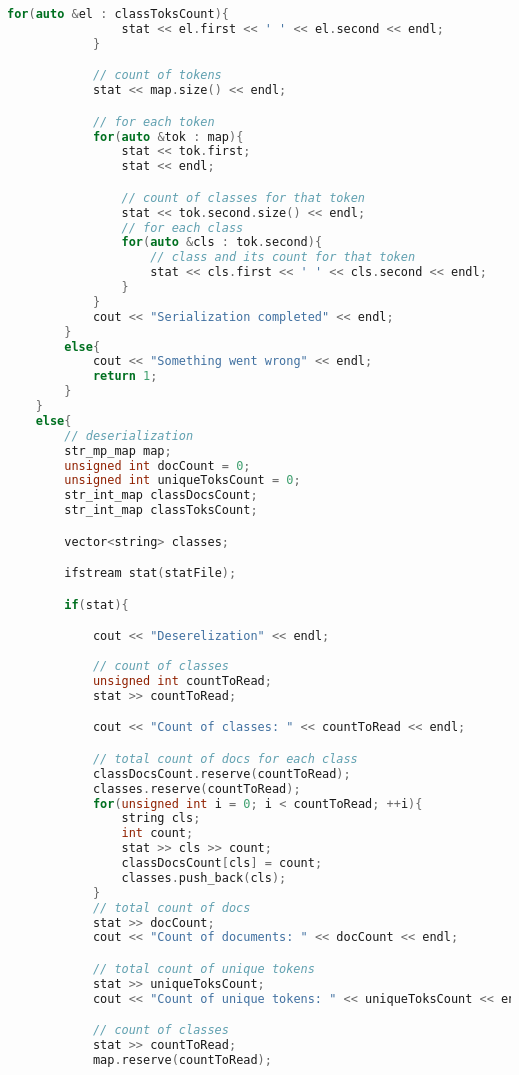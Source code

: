 \documentclass[12pt,a4paper]{scrartcl}
\begin{document}
\begin{lstlisting}[language=C++, basicstyle=\scriptsize]
            for(auto &el : classToksCount){
                stat << el.first << ' ' << el.second << endl;
            }

            // count of tokens
            stat << map.size() << endl;

            // for each token
            for(auto &tok : map){
                stat << tok.first;
                stat << endl;

                // count of classes for that token
                stat << tok.second.size() << endl;
                // for each class 
                for(auto &cls : tok.second){
                    // class and its count for that token
                    stat << cls.first << ' ' << cls.second << endl;
                }
            }
            cout << "Serialization completed" << endl;
        }
        else{
            cout << "Something went wrong" << endl;
            return 1;
        }
    }
    else{
        // deserialization
        str_mp_map map;
        unsigned int docCount = 0;
        unsigned int uniqueToksCount = 0;
        str_int_map classDocsCount;
        str_int_map classToksCount;

        vector<string> classes;

        ifstream stat(statFile);

        if(stat){

            cout << "Deserelization" << endl;
            
            // count of classes
            unsigned int countToRead;
            stat >> countToRead;

            cout << "Count of classes: " << countToRead << endl;

            // total count of docs for each class
            classDocsCount.reserve(countToRead);
            classes.reserve(countToRead);
            for(unsigned int i = 0; i < countToRead; ++i){
                string cls;
                int count;
                stat >> cls >> count;
                classDocsCount[cls] = count;
                classes.push_back(cls);
            }
            // total count of docs
            stat >> docCount;
            cout << "Count of documents: " << docCount << endl;

            // total count of unique tokens
            stat >> uniqueToksCount;
            cout << "Count of unique tokens: " << uniqueToksCount << endl;

            // count of classes
            stat >> countToRead;
            map.reserve(countToRead);


\end{lstlisting}
\end{document}
